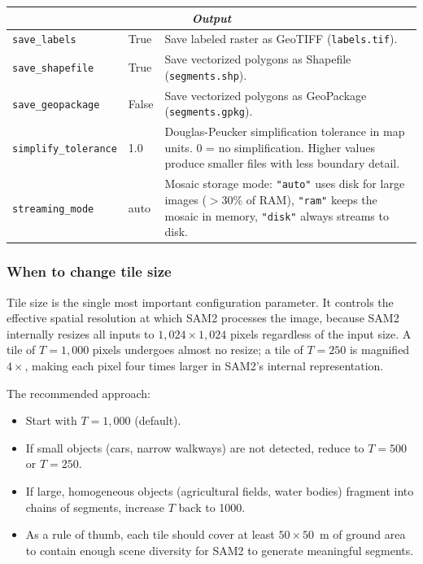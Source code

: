 \documentclass[review,11pt,authoryear]{elsarticle}
\begin{document}
\begin{table}[htbp]
\begin{tabular}{p{3.8cm}lp{6cm}}
\midrule
\multicolumn{3}{c}{\textit{Output}} \\
\midrule
\texttt{save\_labels} & True & Save labeled raster as GeoTIFF (\texttt{labels.tif}). \\
\texttt{save\_shapefile} & True & Save vectorized polygons as Shapefile (\texttt{segments.shp}). \\
\texttt{save\_geopackage} & False & Save vectorized polygons as GeoPackage (\texttt{segments.gpkg}). \\
\texttt{simplify\_tolerance} & 1.0 & Douglas-Peucker simplification tolerance in map units. 0 = no simplification. Higher values produce smaller files with less boundary detail. \\
\texttt{streaming\_mode} & auto & Mosaic storage mode: \texttt{"auto"} uses disk for large images ($>$30\% of RAM), \texttt{"ram"} keeps the mosaic in memory, \texttt{"disk"} always streams to disk. \\
\bottomrule
\end{tabular}
\end{table}

\FloatBarrier

\subsubsection{When to change tile size}

Tile size is the single most important configuration parameter. It controls the effective spatial resolution at which SAM2 processes the image, because SAM2 internally resizes all inputs to $1{,}024 \times 1{,}024$ pixels regardless of the input size. A tile of $T = 1{,}000$ pixels undergoes almost no resize; a tile of $T = 250$ is magnified $4\times$, making each pixel four times larger in SAM2's internal representation.

The recommended approach:
\begin{itemize}
    \item Start with $T = 1{,}000$ (default).
    \item If small objects (cars, narrow walkways) are not detected, reduce to $T = 500$ or $T = 250$.
    \item If large, homogeneous objects (agricultural fields, water bodies) fragment into chains of segments, increase $T$ back to 1000.
    \item As a rule of thumb, each tile should cover at least $50 \times 50$~m of ground area to contain enough scene diversity for SAM2 to generate meaningful segments.
\end{itemize}
\end{document}

